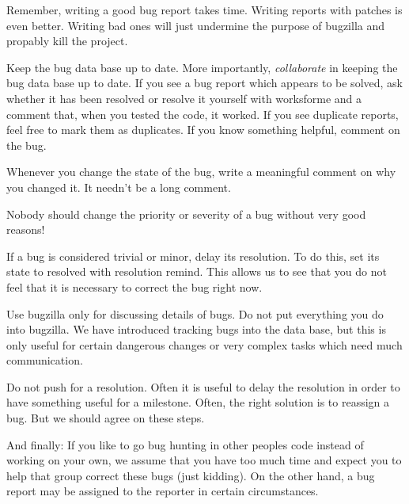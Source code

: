 \documentclass[11pt,nologo,handout]{handout}
\begin{document}
Remember, writing a good bug report takes time.  Writing reports with
patches is even better.  Writing bad ones will just undermine the
purpose of bugzilla and propably kill the project.

Keep the bug data base up to date.  More importantly, \emph{collaborate}
in keeping the bug data base up to date.  If you see a bug report which
appears to be solved, ask whether it has been resolved or resolve it
yourself with worksforme and a comment that, when you tested the code,
it worked.  If you see duplicate reports, feel free to mark them as
duplicates.  If you know something helpful, comment on the bug.

Whenever you change the state of the bug, write a meaningful comment
on why you changed it.  It needn't be a long comment.

Nobody should change the priority or severity of a bug without very
good reasons!

If a bug is considered trivial or minor, delay its resolution.  To do
this, set its state to resolved with resolution remind.  This allows
us to see that you do not feel that it is necessary to correct the bug
right now.

Use bugzilla only for discussing details of bugs.  Do not put everything
you do into bugzilla.  We have introduced tracking bugs into the
data base, but this is only useful for certain dangerous changes or very
complex tasks which need much communication.

Do not push for a resolution.  Often it is useful to delay the resolution
in order to have something useful for a milestone.  Often, the right
solution is to reassign a bug.  But we should agree on these steps.

And finally: If you like to go bug hunting in other peoples code instead
of working on your own, we assume that you have too much time and expect
you to help that group correct these bugs (just kidding).  On the other
hand, a bug report may be assigned to the reporter in certain
circumstances.
\end{document}
